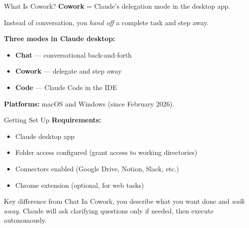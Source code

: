 \documentclass[aspectratio=169]{beamer}
\begin{document}
\begin{frame}{What Is Cowork?}
\textbf{Cowork} = Claude's delegation mode in the desktop app.

Instead of conversation, you \emph{hand off} a complete task and step away.

\bigskip
\begin{center}
\end{center}

\bigskip
\textbf{Three modes in Claude desktop:}
\begin{itemize}
  \item \textbf{Chat} --- conversational back-and-forth
  \item \textbf{Cowork} --- delegate and step away
  \item \textbf{Code} --- Claude Code in the IDE
\end{itemize}

\smallskip
\small\textbf{Platforms:} macOS and Windows (since February 2026).
\end{frame}

\begin{frame}{Getting Set Up}
\textbf{Requirements:}
\begin{itemize}
  \item Claude desktop app
  \item Folder access configured (grant access to working directories)
  \item Connectors enabled (Google Drive, Notion, Slack, etc.)
  \item Chrome extension (optional, for web tasks)
\end{itemize}

\bigskip
\begin{alertblock}{Key difference from Chat}
In Cowork, you describe what you want done and \emph{walk away}. Claude will ask clarifying questions only if needed, then execute autonomously.
\end{alertblock}
\end{frame}
\end{document}
